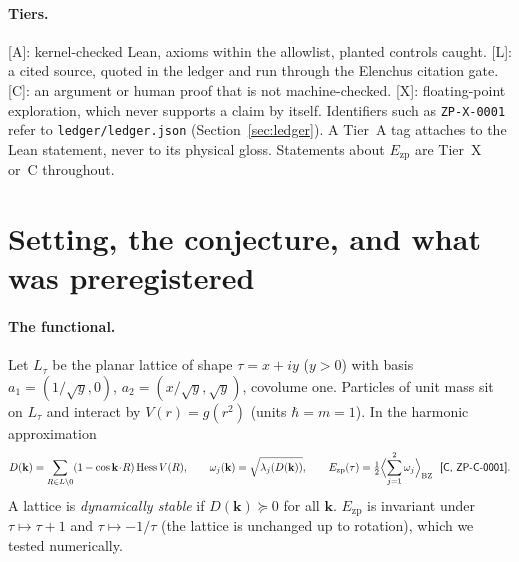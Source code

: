 \documentclass[10pt]{article}
\newcommand{\tier}[1]{\textsf{[#1]}}
\newcommand{\Ezp}{E_{\mathrm{zp}}}
\newcommand{\tr}{\operatorname{tr}}
\begin{document}
\begin{abstract}
\textbf{Tiers L and C.} Cited: Montgomery's theorem (via Deng--Luo) and two results of Luo--Wei, with the Elenchus
citation gate accepting the three quotations. Human arguments: the sum rule $\langle\tr D\rangle=4\pi a-(4\pi^2/a)S(1/a)$, the
Einstein bound, and a concavity decomposition of the curvature. No result here rests on openai/math, apart from the pinned
toolchain. We claim no proof of anything about $\Ezp$ and no breakthrough; the contribution is a negative result with
controls, and a restricted conjecture QU-1$'$ (Tier X-supported) for a range of Gaussians.
\end{abstract}

\paragraph{Tiers.} \tier{A}: kernel-checked Lean, axioms within the allowlist, planted controls caught. \tier{L}: a cited source,
quoted in the ledger and run through the Elenchus citation gate. \tier{C}: an argument or human proof that is not
machine-checked. \tier{X}: floating-point exploration, which never supports a claim by itself. Identifiers such as
\texttt{ZP-X-0001} refer to \texttt{ledger/ledger.json} (Section~\ref{sec:ledger}). A Tier~A tag attaches to the Lean statement,
never to its physical gloss. Statements about $\Ezp$ are Tier~X or~C throughout.

\section{Setting, the conjecture, and what was preregistered}\label{sec:setting}
\paragraph{The functional.} Let $L_\tau$ be the planar lattice of shape $\tau=x+iy$ ($y>0$) with basis
$a_1=(1/\sqrt y,0)$, $a_2=(x/\sqrt y,\sqrt y)$, covolume one. Particles of unit mass sit on $L_\tau$ and interact by
$V(r)=g(r^2)$ (units $\hbar=m=1$). In the harmonic approximation
\[D(\mathbf k)=\sum_{R\in L\setminus 0}(1-\cos\mathbf k\!\cdot\! R)\,\mathrm{Hess}\,V(R),\qquad
\omega_j(\mathbf k)=\sqrt{\lambda_j(D(\mathbf k))},\qquad
\Ezp(\tau)=\tfrac12\Bigl\langle\sum_{j=1}^{2}\omega_j\Bigr\rangle_{\mathrm{BZ}}\ \ \tier{C, ZP-C-0001}.\]
A lattice is \emph{dynamically stable} if $D(\mathbf k)\succeq0$ for all $\mathbf k$. $\Ezp$ is invariant under
$\tau\mapsto\tau+1$ and $\tau\mapsto-1/\tau$ (the lattice is unchanged up to rotation), which we tested numerically.
\end{document}
